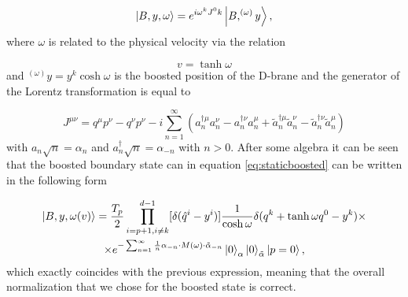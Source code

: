 \begin{equation}
\ket{B,y,\omega} = e^{i\omega^kJ^0k}\ket{B,^{(\omega)}y},
\label{eq:staticboosted}
\end{equation}
where $\omega$ is related to the physical velocity via the relation

\begin{equation}
v = \tanh\omega
\end{equation}
and $^{(\omega)}y = y^k\cosh\omega$ is the boosted position of the D-brane and the generator of the Lorentz transformation is equal to

\begin{equation}
J^{\mu\nu} = q^\mu p^\nu - q^\nu p^\nu - i\sum_{n=1}^\infty\left(a_n^{\dagger \mu}a_n^\nu - a_n^{\dagger \nu}a_n^\mu + \tilde{a}_n^{\dagger \mu}\tilde{a}_n^\nu - \tilde{a}_n^{\dagger \nu}\tilde{a}_n^\mu \right)
\end{equation}
with $a_n\sqrt{n} = \alpha_n$ and $a_n^\dagger\sqrt{n} =\alpha_{-n}$ with $n>0$. After some algebra it can be seen that the boosted boundary state can in equation \eqref{eq:staticboosted} can be written in the following form

\begin{multline}
\ket{B,y,\omega(v)} = \frac{T_p}{2} \prod_{i=p+1,i\neq k}^{d-1}[\delta(\hat{q}^i - y^i)]\frac{1}{\cosh\omega}\delta(q^k + \tanh\omega q^0 - y^k)\times\\
\times e^{-\sum_{n=1}^\infty \frac{1}{n}\alpha_{-n}\cdot M(\omega)\cdot\tilde{\alpha}_{-n}}\ket{0}_\alpha \ket{0}_{\tilde{\alpha}}\ket{p=0},
\end{multline}
which exactly coincides with the previous expression, meaning that the overall normalization that we chose for the boosted state is correct.

